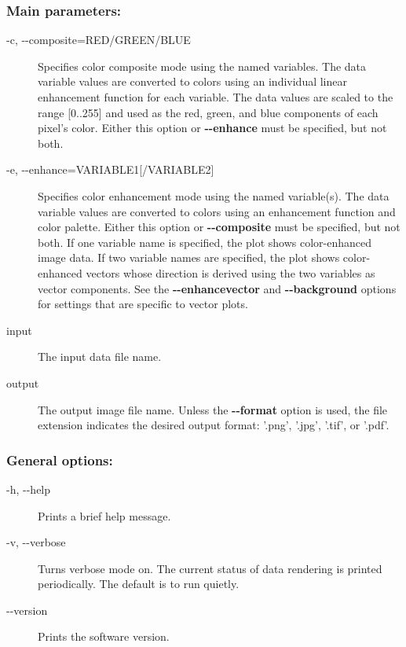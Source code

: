 \subsubsection*{Main parameters:}
\begin{description}
\item[-c, -{-}composite=RED/GREEN/BLUE]Specifies color composite mode using the named variables. The data variable values are converted to colors using an individual linear enhancement function for each variable. The data values are scaled to the range [0..255] and used as the red, green, and blue components of each pixel's color. Either this option or \textbf{-{-}enhance}
 must be specified, but not both.
\item[-e, -{-}enhance=VARIABLE1[/VARIABLE2{]}]Specifies color enhancement mode using the named variable(s). The data variable values are converted to colors using an enhancement function and color palette. Either this option or \textbf{-{-}composite}
 must be specified, but not both. If one variable name is specified, the plot shows color-enhanced image data. If two variable names are specified, the plot shows color-enhanced vectors whose direction is derived using the two variables as vector components. See the \textbf{-{-}enhancevector}
 and \textbf{-{-}background}
 options for settings that are specific to vector plots.
\item[input]The input data file name. 
\item[output]The output image file name. Unless the \textbf{-{-}format}
 option is used, the file extension indicates the desired output format: '.png', '.jpg', '.tif', or '.pdf'.

\end{description}
\subsubsection*{General options:}
\begin{description}
\item[-h, -{-}help]Prints a brief help message.
\item[-v, -{-}verbose]Turns verbose mode on. The current status of data rendering is printed periodically. The default is to run quietly.
\item[-{-}version]Prints the software version.

\end{description}
